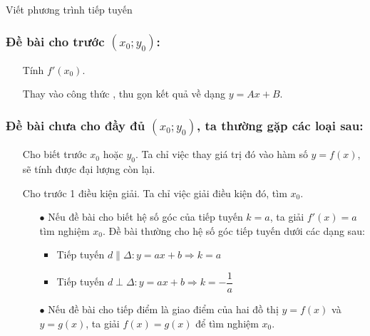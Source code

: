 \begin{dang}{Viết phương trình tiếp tuyến}
	\subsubsection{Đề bài cho trước $(x_0;y_0)$:}
	\begin{itemize}
		\item [\ding{172}] Tính $f'(x_0)$.
		\item [\ding{173}] Thay vào công thức , thu gọn kết quả về dạng $y=Ax+B$.
	\end{itemize}
	\subsubsection{Đề bài chưa cho đầy đủ $(x_0;y_0)$, ta thường gặp các loại sau:}
	\begin{itemize}
		\item [\ding{172}] Cho biết trước $x_0$ hoặc $y_0$. Ta chỉ việc thay giá trị đó vào hàm số $y=f(x)$, sẽ tính được đại lượng còn lại.
		\item [\ding{173}] Cho trước 1 điều kiện giải. Ta chỉ việc giải điều kiện đó, tìm $x_0$.
		\begin{itemize}
			\item [$\bullet$] Nếu đề bài cho biết hệ số góc của tiếp tuyến $k=a$, ta giải $f'(x)=a$ tìm nghiệm $x_0$.
			Đề bài thường cho hệ số góc tiếp tuyến dưới các dạng sau:
			\begin{tcolorbox}[colframe=cyan,colback=red!1!white,boxrule=0.1mm]
				\begin{itemize}
					\item Tiếp tuyến $d\parallel\Delta\colon y=ax+b\Rightarrow k=a$
					\item Tiếp tuyến $d\perp\Delta\colon y=ax+b\Rightarrow k=-\dfrac{1}{a}$
				\end{itemize}
			\end{tcolorbox}
			
			\item [$\bullet$] Nếu đề bài cho tiếp điểm là giao điểm của hai đồ thị $y=f(x)$ và $y=g(x)$, ta giải $f(x)=g(x)$ để tìm nghiệm $x_0$.
		\end{itemize}
	\end{itemize}
\end{dang}